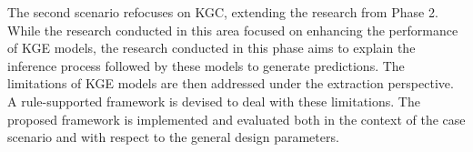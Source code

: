 \begin{itemize}
    The second scenario refocuses on KGC, extending the research from Phase 2. While the research conducted in this area focused on enhancing the performance of KGE models, the research conducted in this phase aims to explain the inference process followed by these models to generate predictions. The limitations of KGE models are then addressed under the extraction perspective. A rule-supported framework is devised to deal with these limitations. The proposed framework is implemented and evaluated both in the context of the case scenario and with respect to the general design parameters. 
\end{itemize}